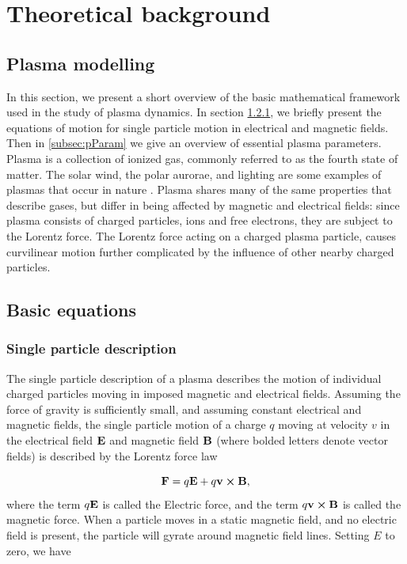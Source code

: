 \chapter{Theoretical background}

\label{sec:theory}

\section{Plasma modelling}
In this section, we present a short overview of the basic mathematical framework used in the study of plasma dynamics. In section \cref{subsec:basicEq}, we briefly present the equations of motion for single particle motion in electrical and magnetic fields. Then in \cref{subsec:pParam} we give an overview of essential plasma parameters.
Plasma is a collection of ionized gas, commonly referred to as the fourth state of matter. The solar wind, the polar aurorae, and lighting are some examples of plasmas that occur in nature \parencite{Chen2018}. Plasma shares many of the same properties that describe gases, but differ in being affected by magnetic and electrical fields: since plasma consists of charged particles, ions and free electrons, they are subject to the Lorentz force. The Lorentz force acting on a charged plasma particle, causes curvilinear motion further complicated by the influence of other nearby charged particles.

\section{Basic equations}

\subsection{Single particle description}
\label{subsec:basicEq}
The single particle description of a plasma describes the motion of individual charged particles moving in imposed magnetic and electrical fields. Assuming the force of gravity is sufficiently small, and assuming constant electrical and magnetic fields, the single particle motion of a charge $q$ moving at velocity $v$ in the electrical field $\vb{E}$ and magnetic field $\vb{B}$ (where bolded letters denote vector fields) is described by the Lorentz force law 

\begin{equation}\label{eq:lorentz}
    \vb{F} = q \vb{E} + q \vb{v} \cp \vb{B},
\end{equation}
where the term $q \vb{E}$ is called the Electric force, and the term $q\vb{v} \cp \vb{B}$ is called the magnetic force. When a particle moves in a static magnetic field, and no electric field is present, the particle will gyrate around magnetic field lines. Setting $E$ to zero, we have

